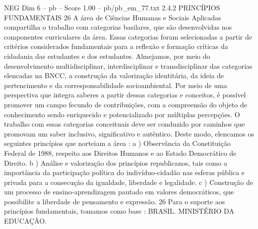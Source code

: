 \begin{textsample}{NEG Dim 6 – pb – Score 1.00 – pb/pb\_em\_77.txt}  \label{ex:f6_neg_087}
2.4.2 PRINCÍPIOS FUNDAMENTAIS 26 A área de Ciências Humanas e Sociais Aplicadas compartilha o trabalho com categorias basilares, que são desenvolvidas nos componentes curriculares da área.
Essas categorias foram selecionadas a partir de critérios considerados fundamentais para a reflexão e formação críticas da cidadania das estudantes e dos estudantes.
Almejamos, por meio do desenvolvimento multidisciplinar, interdisciplinar e transdisciplinar das categorias elencadas na BNCC, a construção da valorização identitária, da ideia de pertencimento e da corresponsabilidade socioambiental.
Por meio de uma perspectiva que integra saberes a partir dessas categorias e conceitos, é possível promover um campo fecundo de contribuições, com a compreensão do objeto de conhecimento sendo enriquecido e potencializado por múltiplas percepções.
O trabalho com essas categorias conceituais deve ser conduzido por caminhos que promovam um saber inclusivo, significativo e autêntico.
Deste modo, elencamos os seguintes princípios que norteiam a área : a ) Observância da Constituição Federal de 1988, respeito aos Direitos Humanos e ao Estado Democrático de Direito. b ) Análise e valorização dos princípios republicanos, tais como a importância da participação política do indivíduo-cidadão nas esferas pública e privada para a consecução da igualdade, liberdade e legalidade. c ) Construção de um processo de ensino-aprendizagem pautado em valores democráticos, que possibilite a liberdade de pensamento e expressão. 26 Para o suporte aos princípios fundamentais, tomamos como base : BRASIL.
MINISTÉRIO DA EDUCAÇÃO.

\end{textsample}
